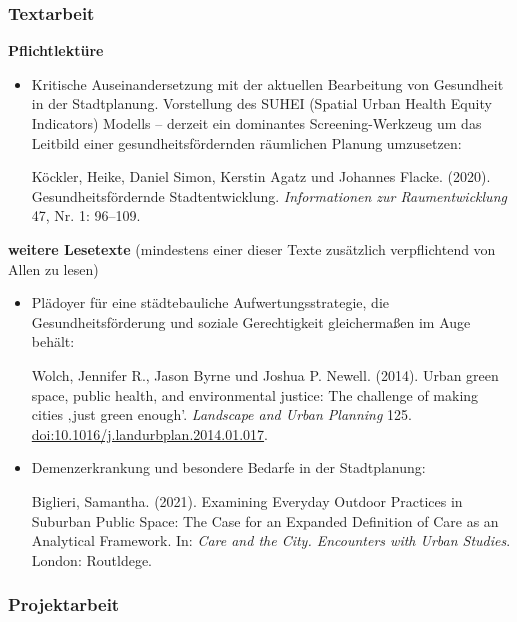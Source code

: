 \documentclass[
  ngerman,
]{article}
\begin{document}
\hypertarget{textarbeit-2}{%
\subsubsection*{Textarbeit}\label{textarbeit-2}}

\textbf{Pflichtlektüre}

\begin{itemize}
\item
  Kritische Auseinandersetzung mit der aktuellen Bearbeitung von Gesundheit in der Stadtplanung. Vorstellung des SUHEI (Spatial Urban Health Equity Indicators) Modells -- derzeit ein dominantes Screening-Werkzeug um das Leitbild einer gesundheitsfördernden räumlichen Planung umzusetzen:

  Köckler, Heike, Daniel Simon, Kerstin Agatz und Johannes Flacke. (2020). Gesundheitsfördernde Stadtentwicklung. \emph{Informationen zur Raumentwicklung} 47, Nr. 1: 96--109.
\end{itemize}

\textbf{weitere Lesetexte}
(mindestens einer dieser Texte zusätzlich verpflichtend von Allen zu lesen)

\begin{itemize}
\item
  Plädoyer für eine städtebauliche Aufwertungsstrategie, die Gesundheitsförderung und soziale Gerechtigkeit gleichermaßen im Auge behält:

  Wolch, Jennifer R., Jason Byrne und Joshua P. Newell. (2014). Urban green space, public health, and environmental justice: The challenge of making cities ‚just green enough'. \emph{Landscape and Urban Planning} 125. \url{doi:10.1016/j.landurbplan.2014.01.017}.
\item
  Demenzerkrankung und besondere Bedarfe in der Stadtplanung:

  Biglieri, Samantha. (2021). Examining Everyday Outdoor Practices in Suburban Public Space: The Case for an Expanded Definition of Care as an Analytical Framework. In: \emph{Care and the City. Encounters with Urban Studies}. London: Routldege.
\end{itemize}

\hypertarget{projektarbeit-1}{%
\subsubsection*{Projektarbeit}\label{projektarbeit-1}}
\end{document}
